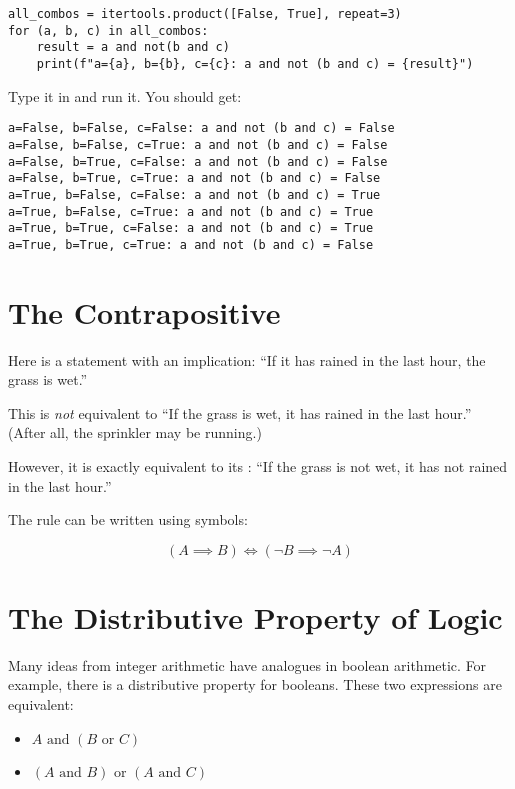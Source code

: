 \begin{verbatim}
all_combos = itertools.product([False, True], repeat=3)
for (a, b, c) in all_combos:
    result = a and not(b and c)
    print(f"a={a}, b={b}, c={c}: a and not (b and c) = {result}")
\end{verbatim}

Type it in and run it. You should get:

\begin{verbatim}
a=False, b=False, c=False: a and not (b and c) = False
a=False, b=False, c=True: a and not (b and c) = False
a=False, b=True, c=False: a and not (b and c) = False
a=False, b=True, c=True: a and not (b and c) = False
a=True, b=False, c=False: a and not (b and c) = True
a=True, b=False, c=True: a and not (b and c) = True
a=True, b=True, c=False: a and not (b and c) = True
a=True, b=True, c=True: a and not (b and c) = False
\end{verbatim}

\section{The Contrapositive}

Here is a statement with an implication: ``If it has rained in the last hour, the grass is wet.''

This is \textit{not} equivalent to ``If the grass is wet, it has
rained in the last hour.'' (After all, the sprinkler may be running.)

However, it is exactly equivalent to its :
``If the grass is not wet, it has not rained in the last hour.'' 

The rule can be written using symbols:

$$\left( A \implies B \right) \iff \left( \neg B \implies \neg A \right)$$

\section{The Distributive Property of Logic}

Many ideas from integer arithmetic have analogues in boolean
arithmetic. For example, there is a distributive property for booleans.  These two expressions are equivalent:
\begin{itemize}
  \item $A \text{ and } \left(B \text{ or } C \right)$
  \item $\left(A \text{ and } B \right) \text{ or } \left( A \text{ and } C \right)$
\end{itemize}

